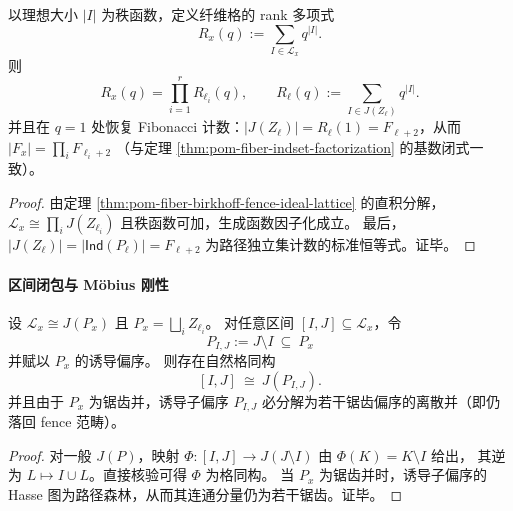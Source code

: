 \begin{corollary}\label{cor:pom-fiber-fence-rank-poly-factorization}
以理想大小 \(|I|\) 为秩函数，定义纤维格的 rank 多项式
\[
R_x(q):=\sum_{I\in \mathcal L_x} q^{|I|}.
\]
则
\[
R_x(q)=\prod_{i=1}^r R_{\ell_i}(q),
\qquad
R_\ell(q):=\sum_{I\in J(Z_\ell)} q^{|I|}.
\]
并且在 \(q=1\) 处恢复 Fibonacci 计数：\(|J(Z_\ell)|=R_\ell(1)=F_{\ell+2}\)，从而
\(
|F_x|=\prod_i F_{\ell_i+2}
\)
（与定理 \ref{thm:pom-fiber-indset-factorization} 的基数闭式一致）。
\end{corollary}
\begin{proof}
由定理 \ref{thm:pom-fiber-birkhoff-fence-ideal-lattice} 的直积分解，
\(\mathcal L_x\cong\prod_i J(Z_{\ell_i})\) 且秩函数可加，生成函数因子化成立。
最后，\(|J(Z_\ell)|=|\mathsf{Ind}(P_\ell)|=F_{\ell+2}\) 为路径独立集计数的标准恒等式。证毕。
\end{proof}

\paragraph{区间闭包与 Möbius 刚性}
\begin{theorem}\label{thm:pom-fence-interval-closure}
设 \(\mathcal L_x\cong J(P_x)\) 且 \(P_x=\bigsqcup_i Z_{\ell_i}\)。
对任意区间 \([I,J]\subseteq \mathcal L_x\)，令
\[
P_{I,J}:=J\setminus I\ \subseteq\ P_x
\]
并赋以 \(P_x\) 的诱导偏序。
则存在自然格同构
\[
[I,J]\ \cong\ J(P_{I,J}).
\]
并且由于 \(P_x\) 为锯齿并，诱导子偏序 \(P_{I,J}\) 必分解为若干锯齿偏序的离散并（即仍落回 fence 范畴）。
\end{theorem}
\begin{proof}
对一般 \(J(P)\)，映射 \(\Phi:[I,J]\to J(J\setminus I)\) 由 \(\Phi(K)=K\setminus I\) 给出，
其逆为 \(L\mapsto I\cup L\)。直接核验可得 \(\Phi\) 为格同构。
当 \(P_x\) 为锯齿并时，诱导子偏序的 Hasse 图为路径森林，从而其连通分量仍为若干锯齿。证毕。
\end{proof}

